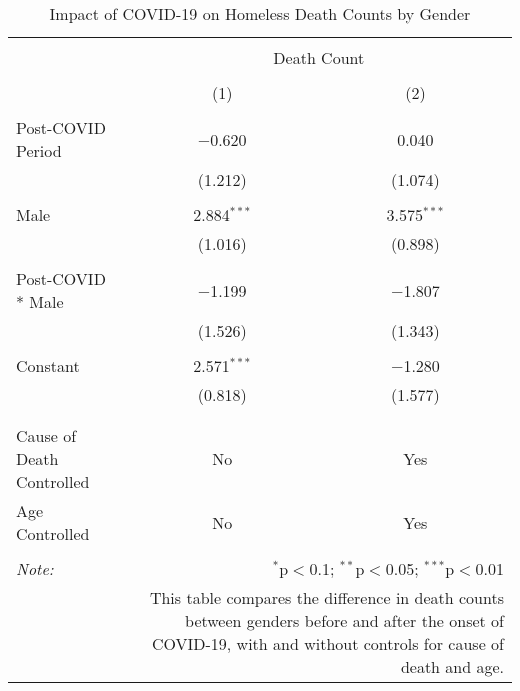 
\begin{table}[!htbp] \centering 
  \caption{Impact of COVID-19 on Homeless Death Counts by Gender} 
  \label{} 
\begin{tabular}{@{\extracolsep{5pt}}lcc} 
\\[-1.8ex]\hline 
\hline \\[-1.8ex] 
 & \multicolumn{2}{c}{Death Count} \\ 
\cline{2-3} 
\\[-1.8ex] & (1) & (2)\\ 
\hline \\[-1.8ex] 
 Post-COVID Period & $-$0.620 & 0.040 \\ 
  & (1.212) & (1.074) \\ 
  & & \\ 
 Male & 2.884$^{***}$ & 3.575$^{***}$ \\ 
  & (1.016) & (0.898) \\ 
  & & \\ 
 Post-COVID * Male & $-$1.199 & $-$1.807 \\ 
  & (1.526) & (1.343) \\ 
  & & \\ 
 Constant & 2.571$^{***}$ & $-$1.280 \\ 
  & (0.818) & (1.577) \\ 
  & & \\ 
\hline \\[-1.8ex] 
Cause of Death Controlled & No & Yes \\ 
Age Controlled & No & Yes \\ 
\hline 
\hline \\[-1.8ex] 
\textit{Note:}  & \multicolumn{2}{r}{$^{*}$p$<$0.1; $^{**}$p$<$0.05; $^{***}$p$<$0.01} \\ 
 & \multicolumn{2}{r}{This table compares the difference in death counts between genders before and after the onset of COVID-19, with and without controls for cause of death and age.} \\ 
\end{tabular} 
\end{table} 
